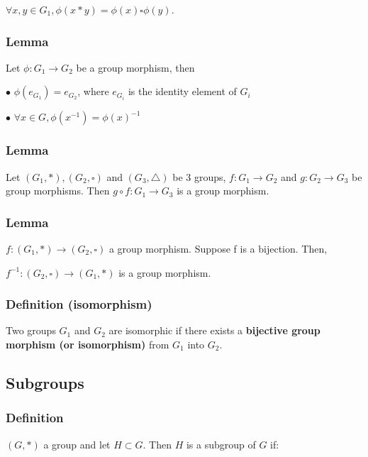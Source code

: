                 \centerline{$\forall x,y\in G_1, \phi(x\ast y) = \phi (x) \square \phi (y)$.}
                
		      \subsubsection{Lemma}
                Let $\phi : G_1 \rightarrow G_2$ be a group morphism, then

                $\bullet$ $\phi (e_{G_1}) = e_{G_2}$, where $e_{G_i}$ is the identity element of $G_i$

                \vspace{1pt}

                $\bullet$ $\forall x \in G, \phi (x^{-1}) = \phi (x)^{-1}$

            \subsubsection{Lemma}
                Let $(G_1, \ast ), (G_2, \square )$ and $(G_3, \triangle)$ be 3 groups, $f : G_1 \rightarrow G_2$ and $g : G_2 \rightarrow G_3$ be group morphisms. Then $g \circ f : G_1 \rightarrow G_3$ is a group morphism.

            \subsubsection{Lemma}
                $f: (G_1, \ast) \rightarrow (G_2, \square)$ a group morphism. Suppose f is a bijection. Then,

                \vspace{2pt}
                
                \centerline{$f^{-1}:(G_2, \square) \rightarrow (G_1, \ast)$ is a group morphism.}

            \subsubsection{Definition (isomorphism)}
                Two groups $G_1$ and $G_2$ are isomorphic if there exists a \textbf{bijective group morphism (or isomorphism)} from $G_1$ into $G_2$.

        \subsection{Subgroups}
            \subsubsection{Definition}
                $(G, \ast)$ a group and let $H \subset G$. Then $H$ is a subgroup of $G$ if:


